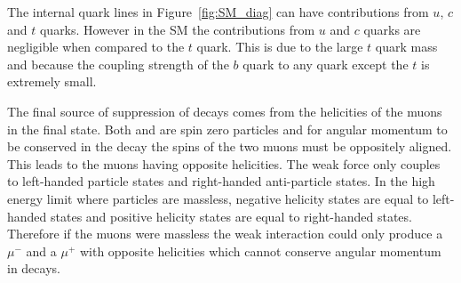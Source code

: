 The internal quark lines in Figure~\ref{fig:SM_diag} can have contributions from $u$, $c$ and $t$ quarks. However in the SM the contributions from $u$ and $c$ quarks are negligible when compared to the $t$ quark. This is due to the large $t$ quark mass and because the coupling strength of the $b$ quark to any quark except the $t$ is extremely small.


The final source of suppression of \bmumu decays comes from the helicities of the muons in the final state. Both \bd and \bs are spin zero particles and for angular momentum to be conserved in the decay the spins of the two muons must be oppositely aligned. This leads to the muons having opposite helicities. %
The weak force only couples to left-handed particle states and right-handed anti-particle states. In the high energy limit where particles are massless, negative helicity states are equal to left-handed states and positive helicity states are equal to right-handed states.
Therefore if the muons were massless the weak interaction could only produce a $\mu^-$ and a $\mu^+$ with opposite helicities which cannot conserve angular momentum in \bmumu decays.
